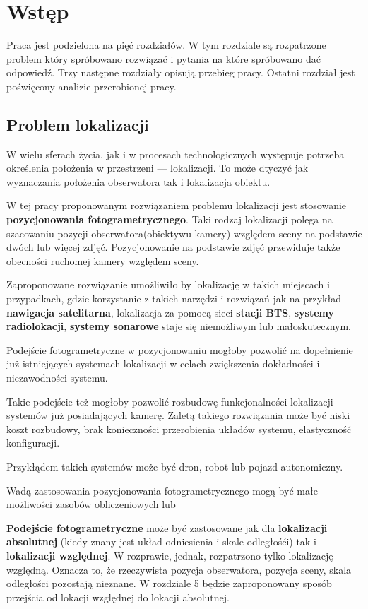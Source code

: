 
\chapter{Wstęp}
Praca jest podzielona na pięć rozdziałów. W tym rozdziale są rozpatrzone problem który spróbowano rozwiązać i pytania na które spróbowano dać odpowiedź. Trzy następne rozdziały opisują przebieg pracy. Ostatni rozdział jest poświęcony analizie przerobionej pracy.

\section{Problem lokalizacji}

W wielu sferach życia, jak i w procesach technologicznych występuje potrzeba określenia położenia w przestrzeni --- lokalizacji. To może dtyczyć jak wyznaczania położenia obserwatora tak i lokalizacja obiektu.

W tej pracy proponowanym rozwiązaniem problemu lokalizacji jest stosowanie \textbf{pozycjonowania fotogrametrycznego}. Taki rodzaj lokalizacji polega na szacowaniu pozycji obserwatora(obiektywu kamery) względem sceny na podstawie dwóch lub więcej zdjęć. Pozycjonowanie na podstawie zdjęć przewiduje także obecności ruchomej kamery względem sceny.

Zaproponowane rozwiązanie umożliwiło by lokalizację w takich miejscach i przypadkach, gdzie korzystanie z takich narzędzi i rozwiązań jak na przykład \textbf{nawigacja satelitarna}, lokalizacja za pomocą sieci \textbf{stacji BTS}, \textbf{systemy radiolokacji}, \textbf{systemy sonarowe} staje się niemożliwym lub małoskutecznym.

Podejście fotogrametryczne w pozycjonowaniu mogłoby pozwolić na dopełnienie już istniejących systemach lokalizacji w celach zwiększenia dokładności i niezawodności systemu.

Takie podejście też mogłoby pozwolić rozbudowę funkcjonalności lokalizacji systemów już posiadających kamerę. Zaletą takiego rozwiązania może być niski koszt rozbudowy, brak konieczności przerobienia układów systemu, elastyczność konfiguracji.

Przykłądem takich systemów może być dron, robot lub pojazd autonomiczny.

Wadą zastosowania pozycjonowania fotogrametrycznego mogą być małe możliwości zasobów obliczeniowych lub

\textbf{Podejście fotogrametryczne} może być zastosowane jak dla \textbf{lokalizacji absolutnej} (kiedy znany jest układ odniesienia i skale odległośći) tak i  \textbf{lokalizacji względnej}. W rozprawie, jednak, rozpatrzono tylko lokalizację względną. Oznacza to, że rzeczywista pozycja obserwatora, pozycja sceny, skala odległości pozostają nieznane. W rozdziale 5 będzie zaproponowany sposób przejścia od lokacji względnej do lokacji absolutnej.

